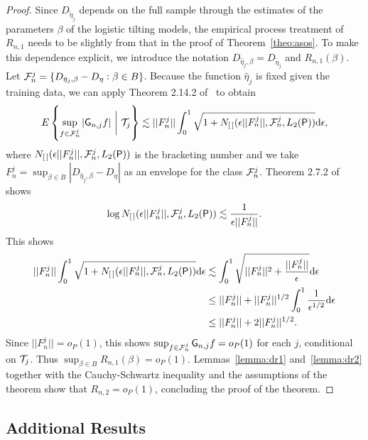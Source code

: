 \begin{proof}
  Since $D_{\tilde \eta_j}$ depends on the full sample through the
  estimates of the parameters $\beta$ of the logistic tilting models,
  the empirical process treatment of $R_{n,1}$ needs to be slightly
  from that in the proof of Theorem~\ref{theo:asos}. To make this
  dependence explicit, we introduce the notation
  $D_{\hat \eta_j,\beta}=D_{\tilde \eta_j}$ and $R_{n,1}(\beta)$. Let
  ${\cal F}_n^j=\{D_{\hat \eta_j,\beta} -
  D_\eta:\beta\in B\}$. Because the function
  $\hat\eta_j$ is fixed given the training data, we can apply Theorem
  2.14.2 of~\cite{vdvaart1996weak} to obtain
  \[E\left\{\sup_{f\in {\cal F}_n^j}|\Gnj f| \,\,\bigg|\,\, {\cal
        T}_j\right\}\lesssim ||F^j_n||\int_0^1\sqrt{1+N_{[\,]}(\epsilon
      ||F_n^j||, {\cal F}_n^j, L_2(\P))}\dd\epsilon, \] where
  $N_{[\,]}(\epsilon ||F_n^j||, {\cal F}_n^j, L_2(\P))$ is the
  bracketing number and we take
  $F_n^j=\sup_{\beta\in B}|D_{\hat \eta_j,\beta} -
  D_\eta|$ as an envelope for the class ${\cal
    F}_n^j$. Theorem 2.7.2 of~\cite{vdvaart1996weak} shows
  \[\log N_{[\,]}(\epsilon ||F_n^j||, {\cal F}_n^j, L_2(\P))\lesssim
    \frac{1}{\epsilon ||F_n^j||}.\]
  This shows
  \begin{align*}||F^j_n||\int_0^1\sqrt{1+N_{[\,]}(\epsilon
    ||F_n^j||, {\cal F}_n^j, L_2(\P))}\dd\epsilon &\lesssim
        \int_0^1\sqrt{||F^j_n||^2+\frac{||F^j_n||}{\epsilon}}\dd\epsilon\\
        &\leq
    ||F^j_n||+||F^j_n||^{1/2}\int_0^1\frac{1}{\epsilon^{1/2}}\dd\epsilon\\
        &\leq ||F^j_n|| + 2 ||F^j_n||^{1/2}.
  \end{align*}
  Since $||F^j_n||=o_P(1)$, this shows
  $\sup_{f\in {\cal F}_n^j}\Gnj f=o_P(1)$ for each $j$, conditional on
  ${\cal T}_j$. Thus $\sup_{\beta\in B} R_{n,1}(\beta)=o_P(1)$.
  Lemmas~\ref{lemma:dr1} and~\ref{lemma:dr2} together with the
  Cauchy-Schwartz inequality and the assumptions of the theorem show
  that $R_{n,2}=o_P(1)$, concluding the proof of the theorem.
\end{proof}

\subsection{Additional Results}

